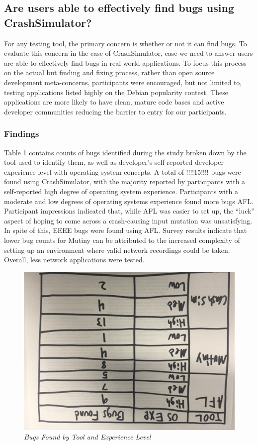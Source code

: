 \subsection{Are users able to effectively find bugs using CrashSimulator?}

For any testing tool, the primary concern is whether or not it can find
bugs.  To evaluate this concern in the case of CrashSimulator, case we need
to answer users are able to effectively find bugs in real world
applications.  To focus this process on the actual but finding and fixing
process, rather than open source development meta-concerns, participants
were encouraged, but not limited to, testing applications listed highly on
the Debian popularity contest.  These applications are more likely to have
clean, mature code bases and active developer communities reducing the
barrier to entry for our participants.

\subsubsection{Findings}

Table 1 contains counts of bugs identified during the study broken down by
the tool used to identify them, as well as developer's self reported
developer experience level with operating system concepts. A total of
!!!!15!!!! bugs were found using CrashSimulator, with the majority reported
by participants with a self-reported high degree of operating system
experience.  Participants with a moderate and low degrees of operating
systems experience found more bugs AFL.  Participant impressions indicated
that, while AFL was easier to set up, the ``luck'' aspect of hoping to come
across a crash-causing input mutation was unsatisfying.  In spite of this,
EEEE bugs were found using AFL.  Survey results indicate that lower bug
counts for Mutiny can be attributed to the increased complexity of setting
up an environment where valid network recordings could be taken.  Overall,
less network applications were tested.

\begin{figure}[t]
  \center{}
  \includegraphics[scale=.5]{images/table1}
  \caption{\emph{Bugs Found by Tool and Experience Level}}
  \label{fig-tool-exp}
\end{figure}


